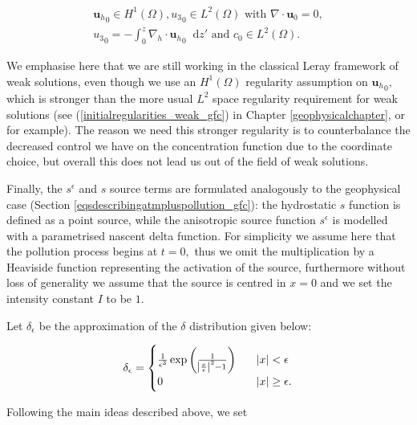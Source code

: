 \documentclass[12pt]{report}
\numberwithin{theorem}{chapter}
\numberwithin{corollary}{chapter}
\numberwithin{lemma}{chapter}
\numberwithin{remark}{chapter}
\numberwithin{definition}{chapter}
\numberwithin{prop}{chapter}
\newcommand*\diff{\mathop{}\!\mathrm{d}}
\begin{document}
\begin{equation}
\begin{gathered}\label{DWMC_weak_initial_data_regularities}
{\mathbf{u}_h}_0 \in H^1 (\Omega), {u_3}_0 \in L^2(\Omega) \text{ with } \nabla \cdot \mathbf{u}_0 = 0,\\
{u_3}_0 = - \int_0^z \nabla_h \cdot {\mathbf{u}_h}_0 \diff z' \text{ and } c_0 \in L^2 (\Omega).
\end{gathered}
\end{equation}

We emphasise here that we are still working in the classical Leray framework of weak solutions, even though we use an $H^1(\Omega)$ regularity assumption on ${\mathbf{u}_h}_0,$ which is stronger than the more usual $L^2$ space regularity requirement for weak solutions (see (\ref{initialregularities_weak_gfc}) in Chapter \ref{geophysicalchapter}, or \cite{azerad2001mathematical} for example). The reason we need this stronger regularity is to counterbalance the decreased control we have on the concentration function due to the coordinate choice, but overall this does not lead us out of the field of weak solutions.

Finally, the $s^\epsilon$ and $s$ source terms are formulated analogously to the geophysical case (Section \ref{eqsdescribingatmpluspollution_gfc}): the hydrostatic $s$ function is defined as a point source, while the anisotropic source function $s^\epsilon$ is modelled with a parametrised nascent delta function. For simplicity we assume here that the pollution process begins at $t = 0,$ thus we omit the multiplication by a Heaviside function representing the activation of the source, furthermore without loss of generality we assume that the source is centred in $x=0$ and we set the intensity constant $I$ to be $1.$

Let $\delta_\epsilon$ be the approximation of the $\delta$ distribution given below:

\begin{equation} \label{delta_eps_source_def}
\delta_\epsilon = 
  \begin{cases}
       \frac{1}{\epsilon^3} \exp{\bigg ( \frac{1}{\abs{{\frac{x}{\epsilon}}}^2-1} \bigg ) } &\quad \abs{x} < \epsilon \\
       0 &\quad \abs{x} \geq \epsilon. \\
  \end{cases}
\end{equation}

Following the main ideas described above, we set
\end{document}
